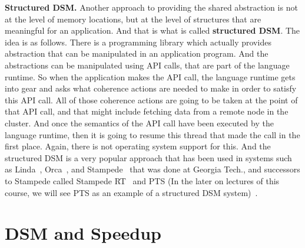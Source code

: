 \documentclass[11pt]{lecture}
\begin{document}
\noindent
{\bf Structured DSM.} Another approach to providing the shared abstraction is not at the level of 
memory locations, but at the level of structures that are meaningful for an application. 
And that is what is called {\bf structured DSM}. The idea is as follows. There is a programming library 
which actually provides abstraction that can be manipulated in an application program. And 
the abstractions can be manipulated using API calls, that are part of the language runtime. 
So when the application makes the API call, the language runtime gets into gear and asks what coherence actions 
are needed to make in order to satisfy this API call. All of those coherence actions are 
going to be taken at the point of that API call, and that might include fetching data from a remote 
node in the cluster. And once the semantics of the API call have been executed by the language runtime, 
then it is going to resume this thread that made the call in the first place. Again, there is not operating 
system support for this. And the structured DSM is a very popular approach that has been used 
in systems such as Linda~\cite{linda}, Orca~\cite{bal1992orca}, and Stampede~\cite{nikhil1998stampede} that was 
done at Georgia Tech., and successors to Stampede called Stampede RT~\cite{stampedert} and 
PTS (In the later on lectures of this course, we will see PTS as an example of a structured DSM system)~\cite{Hilley2000PTS}. 

\section{DSM and Speedup}\label{sec: permance}
\end{document}
